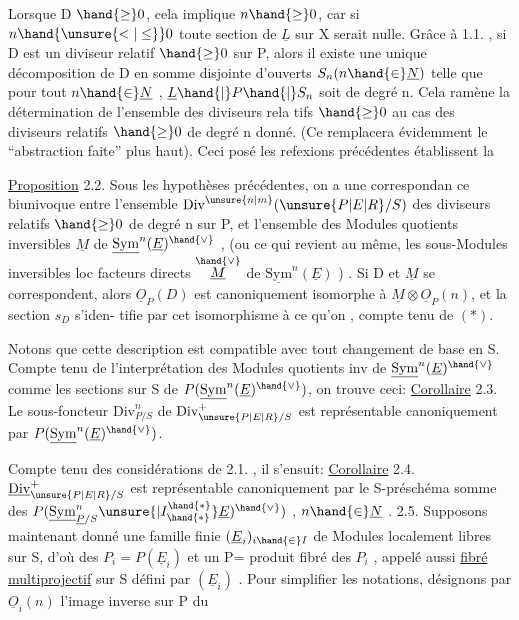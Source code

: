
Lorsque D $\hand{\geq} 0$, cela implique $n \hand{\geq} 0$, car si  $n \hand{\unsure{<|\leq}} 0$ toute section de
$\underline{L}$ sur X serait nulle. Grâce à 1.1. , si D est un diviseur relatif
$\hand{\geq} 0$ sur P, alors il existe une unique décomposition de D en somme
disjointe d'ouverts $S_n (n \hand{\in} \underline{N})$ telle que pour tout $n \hand{\in} \underline{N}$ , $\underline{L}\hand{|}P\hand{|}S_n$ soit de
degré n. Cela ramène la détermination de l'ensemble des diviseurs rela%
tifs $\hand{\geq} 0$ au cas des diviseurs relatifs $\hand{\geq} 0$ de degré n donné. (Ce
\placedmargin{$/\!/$}  remplacera évidemment le ``abstraction faite'' plus haut). Ceci posé
les refexions précédentes établissent la

\uline{Proposition} 2.2. Sous les hypothèses précédentes, on a une correspondan%
ce biunivoque entre l'ensemble $\mathrm{Div}^{\unsure{n|m}}(\unsure{P|E|R}/S)$ des diviseurs relatifs $\hand{\geq} 0$ de
degré n sur P, et l'ensemble des Modules quotients inversibles $\underline{M}$ de
$\underline{\mathrm{Sym}}^{n}(\underline{E})^{\hand{\vee}}$ , (ou ce qui revient au même, les sous-Modules inversibles loc
facteurs directs $\overset{\hand{\vee}}{\underline{M}}$ de $\underline{\mathrm{Sym}}^{n}(\underline{E})$ ) . Si D et $\underline{M}$ se correspondent, alors
$\underline{O}_P(D)$ est canoniquement isomorphe à $\underline{M}\otimes\underline{O}_P(n)$, et la section $s_D$ s'iden-%
tifie par cet isomorphisme à ce qu'on , compte tenu de $(*)$.

Notons que cette description est compatible avec tout changement de
base en S. Compte tenu de l'interprétation des Modules quotients inv de
$\underline{\mathrm{Sym}}^{n}(\underline{E})^{\hand{\vee}}$ comme les sections sur S de $P(\underline{\mathrm{Sym}}^{n}(\underline{E})^{\hand{\vee}})$, on trouve ceci:
\uline{Corollaire} 2.3. Le sous-foncteur  $\mathrm{Div}^{n}_{P/S}$ de $\mathrm{Div}^{+}_{\unsure{P|E|R}/S}$ est représentable
canoniquement par $P(\underline{\mathrm{Sym}}^{n}(\underline{E})^{\hand{\vee}})$.

Compte tenu des considérations de 2.1. , il s'ensuit:
\uline{Corollaire} 2.4. $\underline{\mathrm{Div}}^{+}_{\unsure{P|E|R}/S}$ est représentable canoniquement  par
le S-préschéma somme des $P(\underline{\mathrm{Sym}}^{n}_{\underline{P}/S}\unsure{|I^{\hand{*}}_{\hand{*}}}\underline{E})^{\hand{\vee}})$ , $n \hand{\in} \underline{N}$ .
2.5. Supposons maintenant donné une famille finie $(\underline{E}_i)_{i \hand{\in} I}$ de Modules
localement libres sur S, d'où des $P_i = P(\underline{E}_i)$ et un P= produit fibré des
$P_i$ , appelé aussi \uline{fibré multiprojectif} sur S défini par $(\underline{E}_i)$ . Pour
simplifier les notations, désignons par $\underline{O}_i(n)$ l'image inverse sur P du

